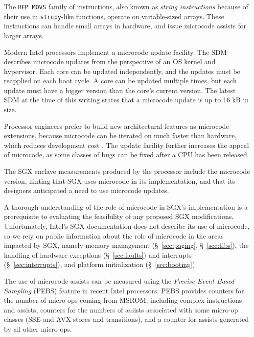 The \texttt{REP MOVS} family of instructions, also known as \textit{string
instructions} because of their use in \texttt{strcpy}-like functions, operate
on variable-sized arrays. These instructions can handle small arrays in
hardware, and issue microcode assists for larger arrays.


Modern Intel processors implement a microcode update facility. The SDM
describes microcode updates from the perspective of an OS kernel and
hypervisor. Each core can be updated independently, and the updates must be
reapplied on each boot cycle. A core can be updated multiple times, but each
update must have a bigger version than the core's current version. The latest
SDM at the time of this writing states that a microcode update is up to 16 kB
in size.

Processor engineers prefer to build new architectural features as microcode
extensions, because microcode can be iterated on much faster than hardware,
which reduces development cost \cite{intel2008genetic, intel2012clusters}. The
update facility further increases the appeal of microcode, as some classes of
bugs can be fixed after a CPU has been released.

The SGX enclave measurements produced by the processor include the microcode
version, hinting that SGX uses microcode in its implementation, and that its
designers anticipated a need to use microcode updates.

A thorough understanding of the role of microcode in SGX's implementation is
a prerequisite to evaluating the feasibility of any proposed SGX modifications.
Unfortunately, Intel's SGX documentation does not describe its use of
microcode, so we rely on public information about the role of microcode in the
areas impacted by SGX, namely memory management (\S~\ref{sec:paging},
\S~\ref{sec:tlbs}), the handling of hardware exceptions
(\S~\ref{sec:faults}) and interrupts (\S~\ref{sec:interrupts}), and
platform initialization (\S~\ref{sec:booting}).


The use of microcode assists can be measured using the
\textit{Precise Event Based Sampling} (PEBS) feature in recent Intel
processors. PEBS provides counters for the number of micro-ops coming from
MSROM, including complex instructions and assists, counters for the numbers of
assists associated with some micro-op classes (SSE and AVX stores and
transitions), and a counter for assists generated by all other micro-ops.

